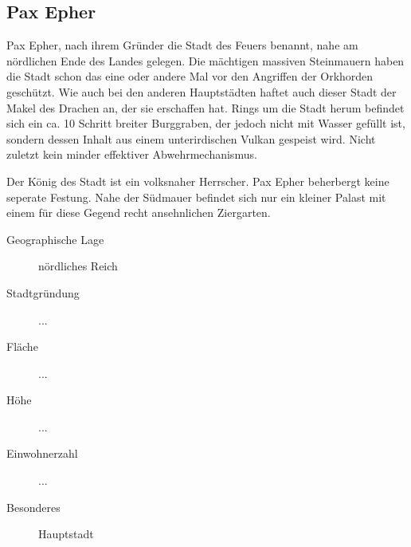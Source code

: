 \subsection{Pax Epher}
\par Pax Epher, nach ihrem Gründer die Stadt des Feuers benannt, nahe am nördlichen Ende des Landes gelegen.
Die mächtigen massiven Steinmauern haben die Stadt schon das eine oder andere Mal vor den Angriffen der Orkhorden
geschützt. Wie auch bei den anderen Hauptstädten haftet auch dieser Stadt der Makel des Drachen an, der sie erschaffen
hat. Rings um die Stadt herum befindet sich ein ca. 10 Schritt breiter Burggraben, der jedoch nicht mit Wasser gefüllt
ist, sondern dessen Inhalt aus einem unterirdischen Vulkan gespeist wird. Nicht zuletzt kein minder effektiver
Abwehrmechanismus.
\par Der König des Stadt ist ein volksnaher Herrscher. Pax Epher beherbergt keine seperate Festung. Nahe der Südmauer
befindet sich nur ein kleiner Palast mit einem für diese Gegend recht ansehnlichen Ziergarten.

\begin{description}
\item [Geographische Lage] nördliches Reich
\item [Stadtgründung] ...
\item [Fläche] ...
\item [Höhe] ...
\item [Einwohnerzahl] ...
\item [Besonderes] Hauptstadt
\end{description}